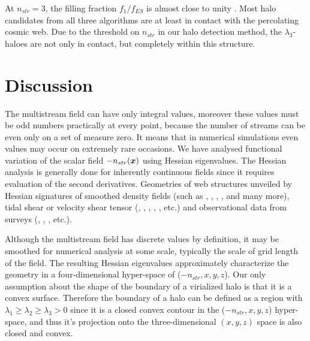 \documentclass[fleqn,usenatbib,useAMS]{mnras}
\begin{document}
At $n_{str} = 3$, the filling fraction $f_1 / f_{ES}$ is almost close to unity \cite{Ramachandra2017}. Most halo candidates from all three algorithms are at least in contact with the percolating cosmic web. Due to the threshold on $n_{str}$ in our halo detection method, the $\lambda_3$-haloes are not only in contact, but completely within this structure. 



\section{Discussion}
\label{sec:discussion}



The multistream field can have only integral  values, moreover these values must be odd numbers practically at every point, because the number of streams can be even only on a set of measure zero. It means that in numerical simulations  even values may occur on extremely rare occasions. 
We have analysed functional variation of the scalar field $-n_{str}(\bmath{x})$ using Hessian eigenvalues. The Hessian analysis is generally done for inherently continuous fields since it requires  evaluation of the second derivatives. %
Geometries of web structures unveiled by Hessian signatures of smoothed density fields (such as \citealt{Sousbie2008a}, \citealt{Aragon-Calvo2007}, \citealt{Aragon-Calvo2010a}, \citealt{Cautun2014a}, \citealt{Bond2010a} and many more), tidal shear or velocity shear tensor (\citealt{Hahn2007}, \citealt{Forero-Romero2009a}, \citealt{Hoffman2012a}, \citealt{Hoffman2012a}, \citealt{Libeskind2013}, \citealt{Cautun2014a} etc.) and observational data from surveys (\citealt{Sousbie2008a}, \citealt{Bond2010a}, \citealt{Bond2010b}, \citealt{Pahwa2016} etc.). 


Although the multistream field has discrete values by definition, it may be smoothed for numerical analysis at some scale, typically the scale of grid length of the field. The resulting Hessian eigenvalues approximately characterize the geometry in a four-dimensional hyper-space of ($-n_{str}, x, y, z$). Our only assumption about  the shape of the boundary of a virialized halo is that it is a convex surface.  Therefore the boundary of a halo can be defined as a region with $\lambda_1 \geq \lambda_2 \geq \lambda_3 > 0$ since it is a closed convex contour in  the ($-n_{str}, x, y, z$) hyper-space, and thus it's projection onto the three-dimensional  $(x,y,z)$ space is also closed and convex. 
\end{document}
